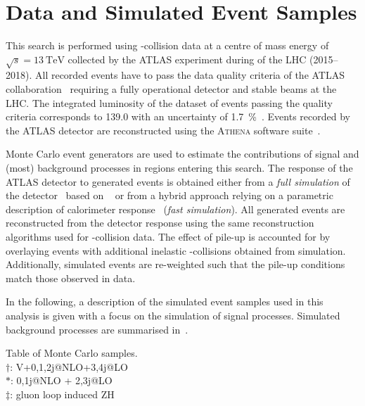 \section{Data and Simulated Event Samples}
\label{sec:data_and_simulation}

This search is performed using \pp-collision data at a centre of mass
energy of $\sqrt{s} = \SI{13}{\TeV}$ collected by the ATLAS experiment
during \RunTwo of the LHC (2015--2018). All recorded events have to
pass the data quality criteria of the ATLAS
collaboration~\cite{DAPR-2018-01} requiring a fully operational
detector and stable beams at the LHC. The integrated luminosity of the
dataset of events passing the quality criteria corresponds to
\SI{139.0}{\ifb} with an uncertainty of
\SI{1.7}{\percent}~\cite{ATLAS-CONF-2019-021}.
Events recorded by the ATLAS detector are reconstructed using the
\textsc{Athena} software suite~\cite{ATL-SOFT-PUB-2021-001}.


Monte Carlo event generators are used to estimate the contributions of
signal and (most) background processes in regions entering this
search. The response of the ATLAS detector to generated events is
obtained either from a \emph{full simulation} of the
detector~\cite{SOFT-2010-01} based on \GEANT~\cite{Agostinelli:2002hh}
or from a hybrid approach relying on a parametric description of
calorimeter response~\cite{SOFT-2010-01} (\emph{fast simulation}). All
generated events are reconstructed from the detector response using
the same reconstruction algorithms used for \pp-collision data. The
effect of pile-up is accounted for by overlaying events with
additional inelastic \pp-collisions obtained from
simulation. Additionally, simulated events are re-weighted such that
the pile-up conditions match those observed in data.

In the following, a description of the simulated event samples used in
this analysis is given with a focus on the simulation of signal
processes. Simulated background processes are summarised
in~.

\begin{sidewaystable}[p]
  \centering

  \caption{Table of Monte Carlo samples.\\
    $\dagger$: V+0,1,2j@NLO+3,4j@LO \\
    $*$: 0,1j@NLO + 2,3j@LO\\
    $\ddag$: gluon loop induced ZH
  }%
  \label{tab:monte_carlo}

  \resizebox{\textwidth}{!}{}
\end{sidewaystable}


